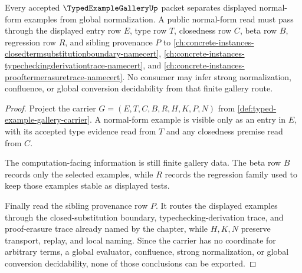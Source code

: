 \begin{theorem}
\label{thm:typed-example-gallery-typed-normal-form-separation}
Every accepted $\TypedExampleGalleryUp$ packet separates displayed normal-form examples from global normalization. A public normal-form read must pass through the displayed entry row $E$, type row $T$, closedness row $C$, beta row $B$, regression row $R$, and sibling provenance $P$ to \autoref{ch:concrete-instances-closedtermsubstitutionboundary-namecert}, \autoref{ch:concrete-instances-typecheckingderivationtrace-namecert}, and \autoref{ch:concrete-instances-prooftermerasuretrace-namecert}. No consumer may infer strong normalization, confluence, or global conversion decidability from that finite gallery route.
\end{theorem}
\begin{proof}
Project the carrier $G=(E,T,C,B,R,H,K,P,N)$ from \autoref{def:typed-example-gallery-carrier}. A normal-form example is visible only as an entry in $E$, with its accepted type evidence read from $T$ and any closedness premise read from $C$.

The computation-facing information is still finite gallery data. The beta row $B$ records only the selected examples, while $R$ records the regression family used to keep those examples stable as displayed tests.

Finally read the sibling provenance row $P$. It routes the displayed examples through the closed-substitution boundary, typechecking-derivation trace, and proof-erasure trace already named by the chapter, while $H,K,N$ preserve transport, replay, and local naming. Since the carrier has no coordinate for arbitrary terms, a global evaluator, confluence, strong normalization, or global conversion decidability, none of those conclusions can be exported.
\end{proof}

